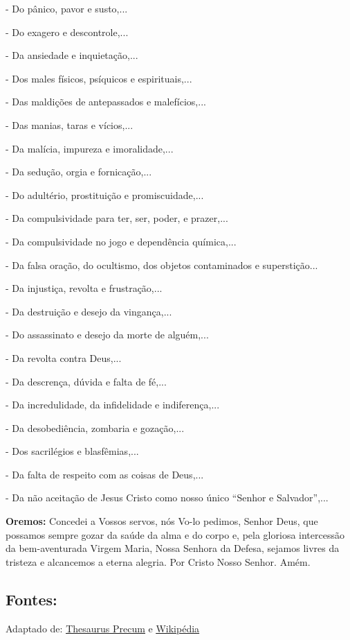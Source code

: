\documentclass[a4paper,14pt]{extarticle} \usepackage[utf8]{inputenc}
\begin{document}
- Do pânico, pavor e susto,...

- Do exagero e descontrole,...

- Da ansiedade e inquietação,...

- Dos males físicos, psíquicos e espirituais,...

- Das maldições de antepassados e malefícios,...

- Das manias, taras e vícios,...

- Da malícia, impureza e imoralidade,...

- Da sedução, orgia e fornicação,...

- Do adultério, prostituição e promiscuidade,...

- Da compulsividade para ter, ser, poder, e prazer,...

- Da compulsividade no jogo e dependência química,...

- Da falsa oração, do ocultismo, dos objetos contaminados e superstição...

- Da injustiça, revolta e frustração,...

- Da destruição e desejo da vingança,...

- Do assassinato e desejo da morte de alguém,...

- Da revolta contra Deus,...

- Da descrença, dúvida e falta de fé,...

- Da incredulidade, da infidelidade e indiferença,...

- Da desobediência, zombaria e gozação,...

- Dos sacrilégios e blasfêmias,...

- Da falta de respeito com as coisas de Deus,...

- Da não aceitação de Jesus Cristo como nosso único “Senhor e Salvador”,...  

\vspace{2em}

\textbf{Oremos:} Concedei a Vossos servos, nós Vo-lo pedimos, Senhor Deus, que possamos sempre gozar da saúde da alma e do corpo e, pela gloriosa intercessão da bem-aventurada Virgem Maria, Nossa Senhora da Defesa, sejamos livres da tristeza e alcancemos a eterna alegria. Por Cristo Nosso Senhor. Amém.   


\vfill

\begin{center}
\subsection*{Fontes:}
Adaptado de: \underline{\href{https://precantur.blogspot.com/2020/01/Nossa-Senhora-da-Defesa.html}{Thesaurus Precum}} e \underline{\href{https://pt.wikipedia.org/wiki/Nossa_Senhora_da_Defesa}{Wikipédia}}
\end{center}
\end{document}
